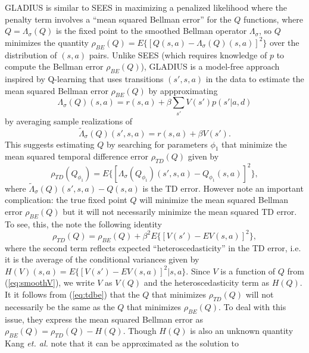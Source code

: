 GLADIUS is similar to SEES in  maximizing a penalized likelihood where the penalty term 
involves a ``mean squared Bellman error'' for the $Q$ functions, where  $Q=\Lambda_\sigma(Q)$ is the fixed point
to the smoothed Bellman operator $\Lambda_\sigma$, so
$Q$ minimizes the quantity $\rho_{BE}(Q)=E\{[Q(s,a)-\Lambda_\sigma(Q)(s,a)]^2\}$ over the distribution of $(s,a)$ pairs.
Unlike SEES (which requires knowledge of $p$ to compute the Bellman error $\rho_{BE}(Q)$), GLADIUS is a model-free approach inspired
by Q-learning that uses transitions $(s',s,a)$ in the data to 
estimate the mean squared Bellman error $\rho_{BE}(Q)$ by appproximating 
\begin{equation}
\Lambda_\sigma(Q)(s,a)=r(s,a)+\beta \sum_{s'} V(s')p(s'|a,d)
\label{eq:Lambda}
\end{equation}
by averaging sample realizations of 
\begin{equation}
   \tilde\Lambda_\sigma(Q)(s',s,a) = r(s,a)+\beta V(s').
\label{eq:Lambdadraw}
\end{equation}
This suggests estimating $Q$ by searching for parameters $\phi_1$ that minimize
the mean squared temporal difference error $\rho_{TD}(Q)$
given by
\begin{equation}
        \rho_{TD}(Q_{\phi_1})=E\{[\Lambda_\sigma(Q_{\phi_1})(s',s,a)-Q_{\phi_1}(s,a)]^2\},
\end{equation}
where $\tilde\Lambda_\sigma(Q)(s',s,a)-Q(s,a)$ is the TD error.
However \citet{kang:2025} note an important  complication: the true fixed point $Q$ will minimize
the mean squared Bellman error $\rho_{BE}(Q)$ but it will not necessarily minimize the mean squared
TD error. To see, this, the note the following identity
\begin{equation}
   \rho_{TD}(Q)=\rho_{BE}(Q)+\beta^2 E\{[V(s')-EV(s,a)]^2\},
\label{eq:tdbe}
\end{equation}
where the second term reflects expected ``heteroscedasticity'' in the TD error, i.e. it is the average of the
conditional variances given by $H(V)(s,a)=E\{[V(s')-EV(s,a)]^2|s,a\}$. Since $V$ is a function of $Q$
from (\ref{eq:smoothV}), we write $V$ as $V(Q)$ and the heteroscedasticity term as $H(Q)$.  It 
it follows from (\ref{eq:tdbe}) that the $Q$ that minimizes $\rho_{TD}(Q)$ will not necessarily be the same as the $Q$ that minimizes $\rho_{BE}(Q)$.
To deal with this issue, they express the mean squared Bellman
error as  $\rho_{BE}(Q)=\rho_{TD}(Q)-H(Q)$. Though $H(Q)$ is also an unknown quantity
Kang {\it et. al.\/}  note that it can be approximated as the solution to
